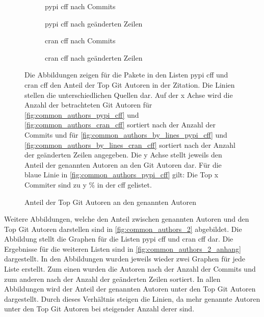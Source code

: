 \begin{figure}
    \begin{subfigure}{.5\textwidth}
        \centering
        
        \caption{\gls{pypi} \gls{cff} nach Commits}
        \label{fig:common_authors_pypi_cff}
    \end{subfigure}%
    \begin{subfigure}{.5\textwidth}
        \centering
        
        \caption{\gls{pypi} \gls{cff} nach geänderten Zeilen}
        \label{fig:common_authors_by_lines_pypi_cff}
    \end{subfigure}
    \begin{subfigure}{.5\textwidth}
        \centering
        
        \caption{\gls{cran} \gls{cff} nach Commits}
        \label{fig:common_authors_cran_cff}
    \end{subfigure}%
    \begin{subfigure}{.5\textwidth}
        \centering
        
        \caption{\gls{cran} \gls{cff} nach geänderten Zeilen}
        \label{fig:common_authors_by_lines_cran_cff}
    \end{subfigure}
    \caption{Anteil der Top Git Autoren an den genannten Autoren}
    \label{fig:common_authors}
    \small
    \raggedright
    Die Abbildungen zeigen für die Pakete in den Listen \gls{pypi} \gls{cff} und \gls{cran} \gls{cff} den Anteil der Top Git Autoren in der Zitation. Die Linien stellen die unterschiedlichen Quellen dar. Auf der x Achse wird die Anzahl der betrachteten Git Autoren für \autoref{fig:common_authors_pypi_cff} und \autoref{fig:common_authors_cran_cff} sortiert nach der Anzahl der Commits und für \autoref{fig:common_authors_by_lines_pypi_cff} und \autoref{fig:common_authors_by_lines_cran_cff} sortiert nach der Anzahl der geänderten Zeilen angegeben. Die y Achse stellt jeweils den Anteil der genannten Autoren an den Git Autoren dar. Für die blaue Linie in \autoref{fig:common_authors_pypi_cff} gilt: Die Top x Commiter sind zu y \% in der \gls{cff} gelistet.
\end{figure}

Weitere Abbildungen, welche den Anteil zwischen genannten Autoren und den Top Git Autoren darstellen sind in \autoref{fig:common_authors_2} abgebildet.
Die Abbildung stellt die Graphen für die Listen \gls{pypi} \gls{cff} und \gls{cran} \gls{cff} dar.
Die Ergebnisse für die weiteren Listen sind in \autoref{fig:common_authors_2_anhang} dargestellt.
In den Abbildungen wurden jeweils wieder zwei Graphen für jede Liste erstellt.
Zum einen wurden die Autoren nach der Anzahl der Commits und zum anderen nach der Anzahl der geänderten Zeilen sortiert.
In allen Abbildungen wird der Anteil der genannten Autoren unter den Top Git Autoren dargestellt.
Durch dieses Verhältnis steigen die Linien, da mehr genannte Autoren unter den Top Git Autoren bei steigender Anzahl derer sind.

